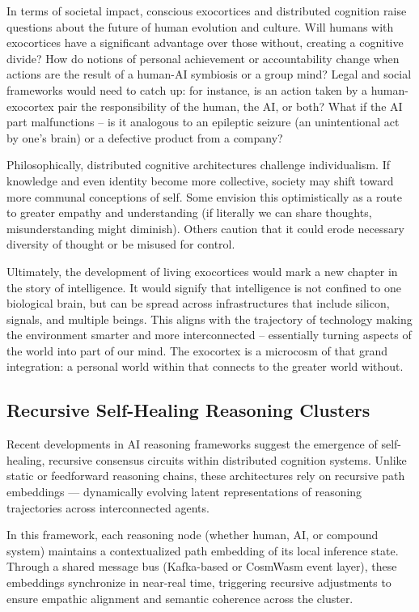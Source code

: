 \documentclass[11pt]{article}
\begin{document}
In terms of societal impact, conscious exocortices and distributed cognition raise questions about the future of human evolution and culture. Will humans with exocortices have a significant advantage over those without, creating a cognitive divide? How do notions of personal achievement or accountability change when actions are the result of a human-AI symbiosis or a group mind? Legal and social frameworks would need to catch up: for instance, is an action taken by a human-exocortex pair the responsibility of the human, the AI, or both? What if the AI part malfunctions -- is it analogous to an epileptic seizure (an unintentional act by one's brain) or a defective product from a company?

Philosophically, distributed cognitive architectures challenge individualism. If knowledge and even identity become more collective, society may shift toward more communal conceptions of self. Some envision this optimistically as a route to greater empathy and understanding (if literally we can share thoughts, misunderstanding might diminish). Others caution that it could erode necessary diversity of thought or be misused for control.

Ultimately, the development of living exocortices would mark a new chapter in the story of intelligence. It would signify that intelligence is not confined to one biological brain, but can be spread across infrastructures that include silicon, signals, and multiple beings. This aligns with the trajectory of technology making the environment smarter and more interconnected -- essentially turning aspects of the world into part of our mind. The exocortex is a microcosm of that grand integration: a personal world within that connects to the greater world without.

\subsection{Recursive Self-Healing Reasoning Clusters}
Recent developments in AI reasoning frameworks suggest the emergence of self-healing, recursive consensus circuits within distributed cognition systems. Unlike static or feedforward reasoning chains, these architectures rely on recursive path embeddings — dynamically evolving latent representations of reasoning trajectories across interconnected agents.

In this framework, each reasoning node (whether human, AI, or compound system) maintains a contextualized path embedding of its local inference state. Through a shared message bus (Kafka-based or CosmWasm event layer), these embeddings synchronize in near-real time, triggering recursive adjustments to ensure empathic alignment and semantic coherence across the cluster.
\end{document}
